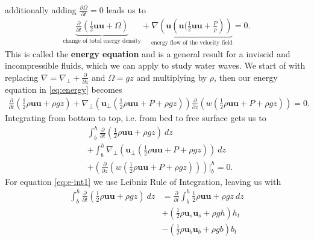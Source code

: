 additionally adding $\frac{\partial \Omega}{\partial t}  =0$ leads us to
\begin{align}
    \underbrace{\frac{\partial }{\partial t} \left(\frac{1}{2}\mathbf{u}\mathbf{u}
    +\Omega\right)}_{\text{change of total energy density}}
    +\underbrace{\nabla \left(\mathbf{u}\left(\mathbf{u}(
    \frac{1}{2}\mathbf{u}\mathbf{u}+\frac{P}{\rho}\right)
\right)}_{\text{energy flow of the velocity field}} = 0.\label{eq:energy}
\end{align}
This is called the \textbf{energy equation} and is a general result for a
inviscid and incompressible fluids, which we can apply to study water waves.
We start of with replacing $\nabla = \nabla_\perp + \frac{\partial }{\partial
z} $ and $\Omega = g z$ and multiplying by $\rho$, then our energy equation
in \ref{eq:energy} becomes
\begin{align}
    \frac{\partial }{\partial t}\left( \frac{1}{2}\rho\mathbf{u}\mathbf{u} + \rho
    g z\right)  + \nabla_\perp\left( \mathbf{u}_\perp\left(
    \frac{1}{2}\rho\mathbf{u}\mathbf{u}+P+\rho gz \right)  \right)
    \frac{\partial}{\partial z} \left( w\left(
    \frac{1}{2}\rho\mathbf{u}\mathbf{u}+P+\rho g z \right)  \right)  = 0.
\end{align}
Integrating from bottom to top, i.e. from bed to free surface gets us to
\begin{align}
    &\int_b^h\frac{\partial }{\partial t}\left( \frac{1}{2}\rho\mathbf{u}\mathbf{u} + \rho
    g z\right)\ dz  \label{eq:e-int1}\\
    &+ \int_b^h \nabla_\perp\left( \mathbf{u}_\perp\left(
    \frac{1}{2}\rho\mathbf{u}\mathbf{u}+P+\rho gz \right)  \right)\
    dz\label{eq:e-int2}\\
    &+ \left(\frac{\partial}{\partial z} \left( w\left(
    \frac{1}{2}\rho\mathbf{u}\mathbf{u}+P+\rho g z \right)
\right)\right)\Bigg|_b^h \label{eq:e-int3}
    = 0.
\end{align}
For equation \ref{eq:e-int1} we use Leibniz Rule of Integration, leaving us
with
\begin{align}
    \int_b^h\frac{\partial }{\partial t}\left( \frac{1}{2}\rho\mathbf{u}\mathbf{u} + \rho
    g z\right)\ dz
    &= \frac{\partial }{\partial t} \int_b^h
    \frac{1}{2}\rho\mathbf{u}\mathbf{u} + \rho gz \ dz\\
    &+ \left( \frac{1}{2}\rho \mathbf{u}_s \mathbf{u}_s  + \rho g h \right)
    h_t\\
    &- \left( \frac{1}{2}\rho \mathbf{u}_b \mathbf{u}_b  + \rho g b \right)
    b_t
\end{align}
